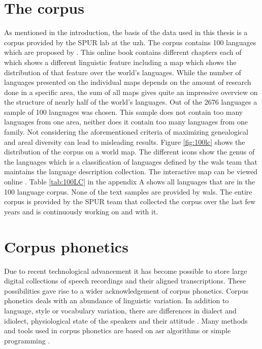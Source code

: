\section{The corpus}
\label{corpus}
As mentioned in the introduction, the basis of the data used in this thesis is a corpus provided by the SPUR lab at the \ac{uzh}. The corpus contains 100 languages which are proposed by \citet{Comrie&Dryer.2013}. This online book contains different chapters each of which shows a different linguistic feature including a map which shows the distribution of that feature over the world's languages. While the number of languages presented on the individual maps depends on the amount of research done in a specific area, the sum of all maps gives quite an impressive overview on the structure of nearly half of the world's languages. Out of the 2676 languages a sample of 100 languages was chosen. This sample does not contain too many languages from one area, neither does it contain too many languages from one family. Not considering the aforementioned criteria of maximizing genealogical and areal diversity can lead to misleading results. Figure \ref{fig:100lc} shows the distribution of the corpus on a world map. The different icons show the genus of the languages which is a classification of languages defined by the \ac{wals} team that maintains the language description collection. The interactive map can be viewed online \citep{100LC.21.07.2021}. Table \ref{tab:100LC} in the appendix A shows all languages that are in the 100 language corpus. None of the text samples are provided by \ac{wals}. The entire corpus is provided by the SPUR team that collected the corpus over the last few years and is continuously working on and with it.


\section{Corpus phonetics}
Due to recent technological advancement it has become possible to store large digital collections of speech recordings and their aligned transcriptions. These possibilities gave rise to a wider acknowledgement of corpus phonetics. Corpus phonetics deals with an abundance of linguistic variation. In addition to language, style or vocabulary variation, there are differences in dialect and idiolect, physiological state of the speakers and their attitude \citep{Liberman.2019, Chodroff.19.07.2019}. Many methods and tools used in corpus phonetics are based on \ac{asr} algorithms or simple programming \citep{Chodroff.19.07.2019}.

